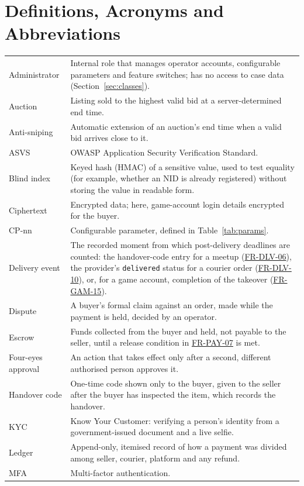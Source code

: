 \documentclass[11pt,a4paper]{report}
\makeatletter
\newcommand{\rr}[1]{\hyperlink{#1}{#1}}
\newenvironment{deftable}{\small\begin{longtable}{@{}>{\raggedright\arraybackslash}p{3.6cm}>{\raggedright\arraybackslash}p{11.3cm}@{}}}{\end{longtable}}
\makeatother
\begin{document}
\section{Definitions, Acronyms and Abbreviations}
\begin{deftable}
Administrator & Internal role that manages operator accounts, configurable parameters and feature switches; has no access to case data (Section~\ref{sec:classes}). \\
Auction & Listing sold to the highest valid bid at a server-determined end time. \\
Anti-sniping & Automatic extension of an auction's end time when a valid bid arrives close to it. \\
ASVS & OWASP Application Security Verification Standard. \\
Blind index & Keyed hash (HMAC) of a sensitive value, used to test equality (for example, whether an NID is already registered) without storing the value in readable form. \\
Ciphertext & Encrypted data; here, game-account login details encrypted for the buyer. \\
CP-nn & Configurable parameter, defined in Table~\ref{tab:params}. \\
Delivery event & The recorded moment from which post-delivery deadlines are counted: the handover-code entry for a meetup (\rr{FR-DLV-06}), the provider's \texttt{delivered} status for a courier order (\rr{FR-DLV-10}), or, for a game account, completion of the takeover (\rr{FR-GAM-15}). \\
Dispute & A buyer's formal claim against an order, made while the payment is held, decided by an operator. \\
Escrow & Funds collected from the buyer and held, not payable to the seller, until a release condition in \rr{FR-PAY-07} is met. \\
Four-eyes approval & An action that takes effect only after a second, different authorised person approves it. \\
Handover code & One-time code shown only to the buyer, given to the seller after the buyer has inspected the item, which records the handover. \\
KYC & Know Your Customer: verifying a person's identity from a government-issued document and a live selfie. \\
Ledger & Append-only, itemised record of how a payment was divided among seller, courier, platform and any refund. \\
MFA & Multi-factor authentication. \\

\end{deftable}
\end{document}
